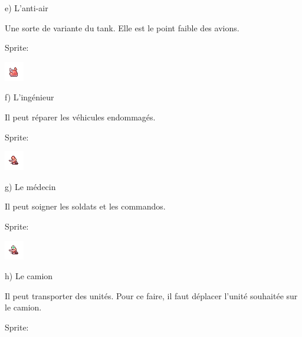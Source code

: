 \documentclass{article}
\begin{document}
\par
e)                 L'anti-air
\newline

\par
Une sorte de variante du tank. Elle est le point faible des avions.
\newline

\par
Sprite:
\newline

\includegraphics[scale=1]{AA}

\par
f)                 L'ingénieur
\newline

\par
Il peut réparer les véhicules endommagés.
\newline

\par
Sprite:
\newline

\includegraphics[scale=1]{ing}

\par
g)                 Le médecin
\newline

\par
Il peut soigner les soldats et les commandos.
\newline

\par
Sprite:
\newline

\includegraphics[scale=1]{medic}

\par
h)                 Le camion
\newline

\par
Il peut transporter des unités. Pour ce faire, il faut déplacer l'unité souhaitée sur le camion.
\newline

\par
Sprite:
\newline
\end{document}
